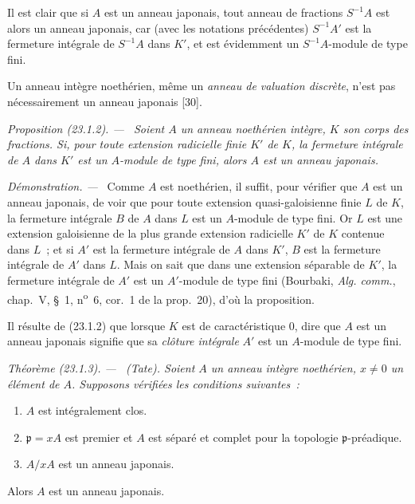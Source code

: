 \documentclass[10pt,oneside]{book}
\makeatletter
\newcommand{\setmanualcurrentlabel}[1]{\def\@currentlabel{#1}}
\newenvironment{proposition}[1][]{%
  \setmanualcurrentlabel{#1}\par\medskip\noindent\itshape Proposition (#1). ---\ }{\par}
\newenvironment{theorem}[1][]{%
  \setmanualcurrentlabel{#1}\par\medskip\noindent\itshape Théorème (#1). ---\ }{\par}
\newenvironment{proof}{%
  \par\medskip\noindent\textit{Démonstration. ---\ }}{\par}
\makeatother
\begin{document}
Il est clair que si $A$ est un anneau japonais, tout anneau de fractions
$S^{-1}A$ est alors un anneau japonais, car (avec les notations précédentes)
$S^{-1}A'$ est la fermeture intégrale de $S^{-1}A$ dans $K'$, et est
évidemment un $S^{-1}A$-module de type fini.

Un anneau intègre noethérien, même un \emph{anneau de valuation discrète},
n'est pas nécessairement un anneau japonais [30].

\begin{proposition}[23.1.2]
\label{0.23.1.2-fr}
Soient $A$ un anneau noethérien intègre, $K$ son corps des fractions. Si, pour
toute extension radicielle finie $K'$ de $K$, la fermeture intégrale de $A$
dans $K'$ est un $A$-module de type fini, alors $A$ est un anneau japonais.
\end{proposition}

\begin{proof}
Comme $A$ est noethérien, il suffit, pour vérifier que $A$ est un anneau
japonais, de voir que pour toute extension quasi-galoisienne finie $L$ de
$K$, la fermeture intégrale $B$ de $A$ dans $L$ est un $A$-module de type
fini. Or $L$ est une extension galoisienne de la plus grande extension
radicielle $K'$ de $K$ contenue dans $L$~; et si $A'$ est la fermeture
intégrale de $A$ dans $K'$, $B$ est la fermeture intégrale de $A'$ dans $L$.
Mais on sait que dans une extension séparable de $K'$, la fermeture intégrale
de $A'$ est un $A'$-module de type fini (Bourbaki, \emph{Alg. comm.},
chap.~V, §~1, n\textsuperscript{o}~6, cor.~1 de la prop.~20), d'où la
proposition.
\end{proof}

Il résulte de (23.1.2) que lorsque $K$ est de caractéristique $0$, dire que
$A$ est un anneau japonais signifie que sa \emph{clôture intégrale} $A'$ est
un $A$-module de type fini.

\begin{theorem}[23.1.3]
\label{0.23.1.3-fr}
\textnormal{(Tate).} Soient $A$ un anneau intègre noethérien, $x\neq0$ un
élément de $A$. Supposons vérifiées les conditions suivantes~:
\begin{enumerate}
  \item[(i)] $A$ est intégralement clos.
  \item[(ii)] $\mathfrak p=xA$ est premier et $A$ est séparé et complet pour
  la topologie $\mathfrak p$-préadique.
  \item[(iii)] $A/xA$ est un anneau japonais.
\end{enumerate}
Alors $A$ est un anneau japonais.
\end{theorem}
\end{document}
